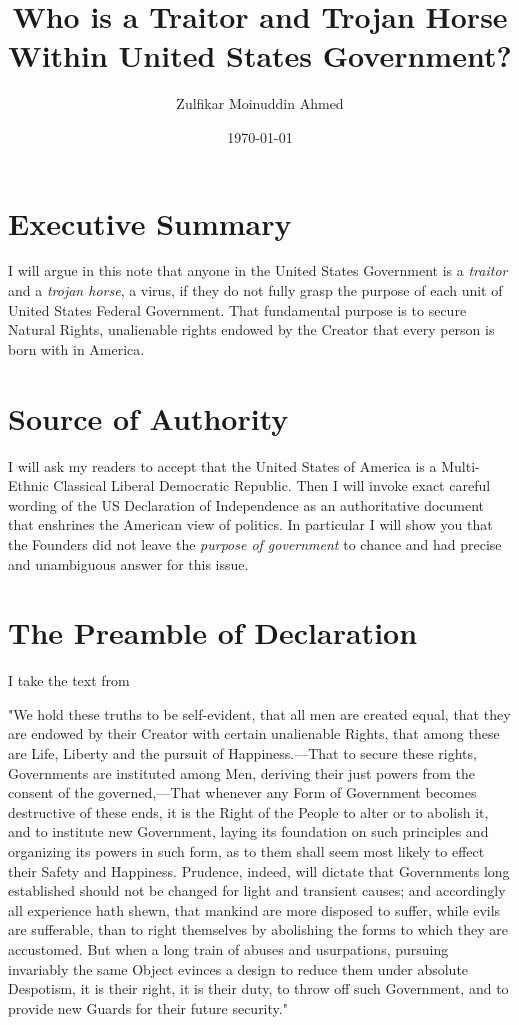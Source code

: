 \documentclass{amsart}
\title{Who is a Traitor and Trojan Horse Within United States Government?}
\author{Zulfikar Moinuddin Ahmed}
\date{\today}
\begin{document}
\maketitle

\section{Executive Summary}
I will argue in this note that anyone in the United States Government is a {\em traitor} and a {\em trojan horse}, a virus, if they do not fully grasp the purpose of each unit of United States Federal Government.  That fundamental purpose is to secure Natural Rights, unalienable rights endowed by the Creator that every person is born with in America.  

\section{Source of Authority}

I will ask my readers to accept that the United States of America is a Multi-Ethnic Classical Liberal Democratic Republic.  Then I will invoke exact careful wording of the US Declaration of Independence as an authoritative document that enshrines the American view of politics.  In particular I will show you that the Founders did not leave the {\em purpose of government} to chance and had precise and unambiguous answer for this issue.

\section{The Preamble of Declaration}

I take the text from \cite{WikiDec}

"We hold these truths to be self-evident, that all men are created equal, that they are endowed by their Creator with certain unalienable Rights, that among these are Life, Liberty and the pursuit of Happiness.—That to secure these rights, Governments are instituted among Men, deriving their just powers from the consent of the governed,—That whenever any Form of Government becomes destructive of these ends, it is the Right of the People to alter or to abolish it, and to institute new Government, laying its foundation on such principles and organizing its powers in such form, as to them shall seem most likely to effect their Safety and Happiness. Prudence, indeed, will dictate that Governments long established should not be changed for light and transient causes; and accordingly all experience hath shewn, that mankind are more disposed to suffer, while evils are sufferable, than to right themselves by abolishing the forms to which they are accustomed. But when a long train of abuses and usurpations, pursuing invariably the same Object evinces a design to reduce them under absolute Despotism, it is their right, it is their duty, to throw off such Government, and to provide new Guards for their future security."
\end{document}
